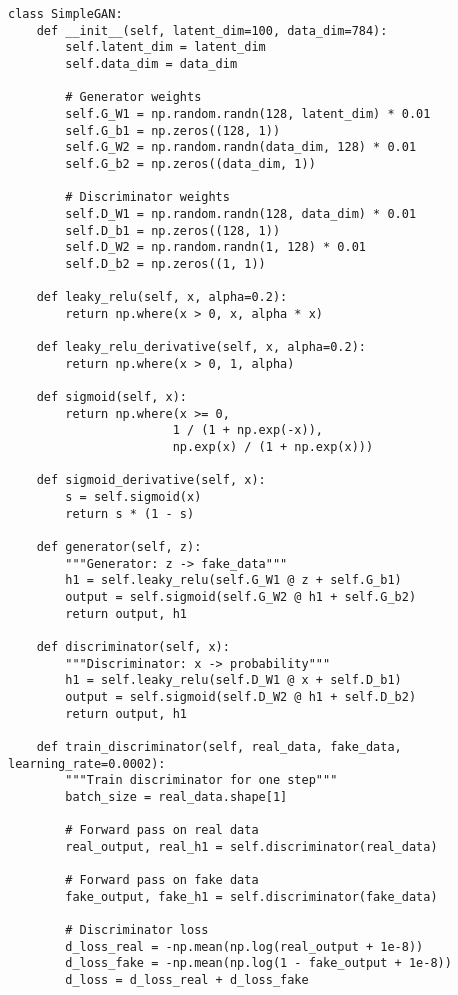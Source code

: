 ﻿\documentclass[12pt,a4paper]{article}
\begin{document}
\begin{lstlisting}
class SimpleGAN:
    def __init__(self, latent_dim=100, data_dim=784):
        self.latent_dim = latent_dim
        self.data_dim = data_dim
        
        # Generator weights
        self.G_W1 = np.random.randn(128, latent_dim) * 0.01
        self.G_b1 = np.zeros((128, 1))
        self.G_W2 = np.random.randn(data_dim, 128) * 0.01
        self.G_b2 = np.zeros((data_dim, 1))
        
        # Discriminator weights
        self.D_W1 = np.random.randn(128, data_dim) * 0.01
        self.D_b1 = np.zeros((128, 1))
        self.D_W2 = np.random.randn(1, 128) * 0.01
        self.D_b2 = np.zeros((1, 1))
    
    def leaky_relu(self, x, alpha=0.2):
        return np.where(x > 0, x, alpha * x)
    
    def leaky_relu_derivative(self, x, alpha=0.2):
        return np.where(x > 0, 1, alpha)
    
    def sigmoid(self, x):
        return np.where(x >= 0,
                       1 / (1 + np.exp(-x)),
                       np.exp(x) / (1 + np.exp(x)))
    
    def sigmoid_derivative(self, x):
        s = self.sigmoid(x)
        return s * (1 - s)
    
    def generator(self, z):
        """Generator: z -> fake_data"""
        h1 = self.leaky_relu(self.G_W1 @ z + self.G_b1)
        output = self.sigmoid(self.G_W2 @ h1 + self.G_b2)
        return output, h1
    
    def discriminator(self, x):
        """Discriminator: x -> probability"""
        h1 = self.leaky_relu(self.D_W1 @ x + self.D_b1)
        output = self.sigmoid(self.D_W2 @ h1 + self.D_b2)
        return output, h1
    
    def train_discriminator(self, real_data, fake_data, learning_rate=0.0002):
        """Train discriminator for one step"""
        batch_size = real_data.shape[1]
        
        # Forward pass on real data
        real_output, real_h1 = self.discriminator(real_data)
        
        # Forward pass on fake data
        fake_output, fake_h1 = self.discriminator(fake_data)
        
        # Discriminator loss
        d_loss_real = -np.mean(np.log(real_output + 1e-8))
        d_loss_fake = -np.mean(np.log(1 - fake_output + 1e-8))
        d_loss = d_loss_real + d_loss_fake
        

\end{lstlisting}
\end{document}
